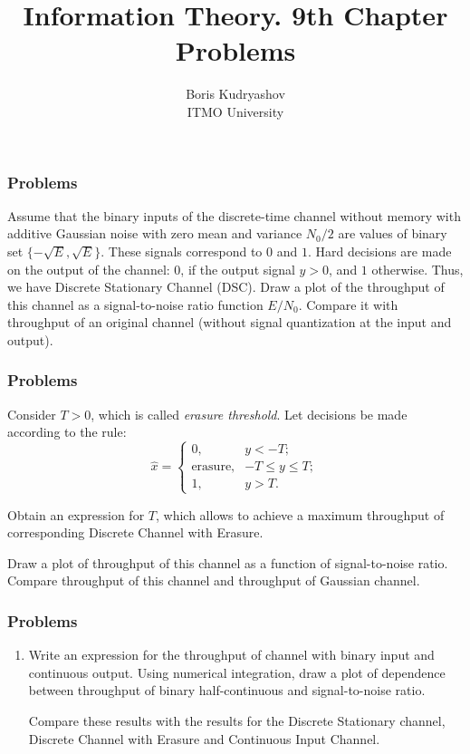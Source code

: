 \documentclass[14pt]{beamer}
\title{\small{Information Theory. 9th Chapter Problems}}
\author{\huge{
Boris Kudryashov \\
\vspace{30pt}
ITMO University
}}
\begin{document}
\maketitle


\begin{frame}
\frametitle{Problems}
\begin{enumerate}
\small{


    \item[1] 
    Assume that the binary inputs of the discrete-time channel without memory with additive Gaussian noise with zero mean and variance $N_0/2$ are values of binary set $\{-\sqrt E,\sqrt E\}$. 
    These signals correspond to $0$ and $1$.
    Hard decisions are made on the output of the channel: 0, if the output signal $y>0$, and $1$ otherwise. Thus, we have Discrete Stationary Channel (DSC).
    Draw a plot of the throughput of this channel as a signal-to-noise ratio function $ E / N_0 $. Compare it with throughput of an original channel (without signal quantization at the input and output).
}
\end{enumerate}
\end{frame}

\begin{frame}
\frametitle{Problems}
\begin{enumerate}
\small{

    \item[2]
    Consider $T>0$, which is called \emph{erasure threshold}.
    Let decisions be made according to the rule:
    \[
    \hat{x}=\left\{\begin{array}{ll}
                0, & y<-T; \\
                {\mbox {erasure}}, & -T\le y\le T; \\
                1, & y>T.
              \end{array}
              \right.
    \]
    
    Obtain an expression for  $T$, which allows to achieve a maximum throughput of corresponding Discrete Channel with Erasure.
    
    Draw a plot of throughput of this channel as a function of signal-to-noise ratio. Compare throughput of this channel and throughput of Gaussian channel.
}
\end{enumerate}
\end{frame}

\begin{frame}
\frametitle{Problems}
\begin{enumerate}

    \item[3] 
    Write an expression for the throughput of channel with binary input and continuous output. 
    Using numerical integration, draw a plot of dependence between  throughput of binary half-continuous and signal-to-noise ratio.
    
    Compare these results with the results for the
    Discrete Stationary channel, Discrete Channel with Erasure and Continuous Input Channel.


\end{enumerate}
\end{frame}
\end{document}
